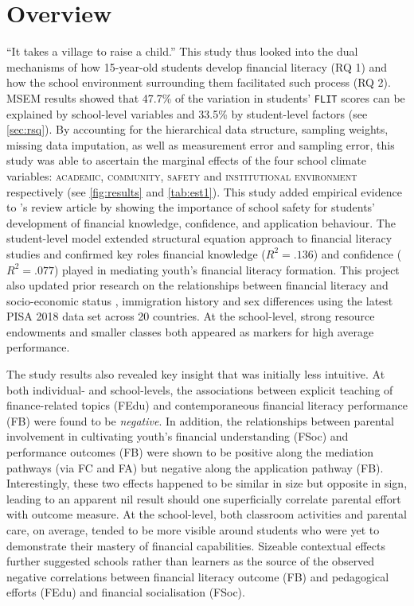 \documentclass[a4paper,11pt,UKenglish,twoside,openright]{report}\usepackage[]{graphicx}\usepackage[]{color}
\begin{document}
\section{Overview}
``It takes a village to raise a child.'' This study thus looked into the dual mechanisms of how 15-year-old students develop financial literacy (RQ 1) and how the school environment surrounding them facilitated such process (RQ 2). MSEM results showed that 47.7\% of the variation in students' \texttt{FLIT} scores can be explained by school-level variables and 33.5\% by student-level factors (see \cref{sec:rsq}). By accounting for the hierarchical data structure, sampling weights, missing data imputation, as well as measurement error and sampling error, this study was able to ascertain the marginal effects of the four school climate variables: \textsc{academic}, \textsc{community}, \textsc{safety} and \textsc{institutional environment} \parencite{wang:2016} respectively (see \cref{fig:results} and \cref{tab:est1}). This study added empirical evidence to \textcite{kutsyuruba:2015}'s review article by showing the importance of school safety for students' development of financial knowledge, confidence, and application behaviour. The student-level model extended  structural equation approach to financial literacy studies and confirmed key roles financial knowledge ($R^2 = .136$) and confidence ($R^2 = .077$) played in mediating youth's financial literacy formation. This project also updated prior research on the relationships between financial literacy and socio-economic status \parencite{ali:2016, potrich:2015a}, immigration history \parencite{gramatki:2017} and sex differences \parencite[amongst many,][]{lusardi:2010} using the latest PISA 2018 data set across 20 countries. At the school-level, strong resource endowments \parencite{uline:2008} and smaller classes \parencite{finn:1999} both appeared as markers for high average performance.

The study results also revealed key insight that was initially less intuitive. At both individual- and school-levels, the associations between explicit teaching of finance-related topics (FEdu) and contemporaneous financial literacy performance (FB) were found to be \emph{negative}. In addition, the relationships between parental involvement in cultivating youth's financial understanding (FSoc) and performance outcomes (FB) were shown to be positive along the mediation pathways (via FC and FA) but negative along the application pathway (FB). Interestingly, these two effects happened to be similar in size but opposite in sign, leading to an apparent nil result should one superficially correlate parental effort with outcome measure. At the school-level, both classroom activities and parental care, on average, tended to be more visible around students who were yet to demonstrate their mastery of financial capabilities. Sizeable contextual effects further suggested schools rather than learners as the source of the observed negative correlations between financial literacy outcome (FB) and pedagogical efforts (FEdu) and financial socialisation (FSoc).
\end{document}

